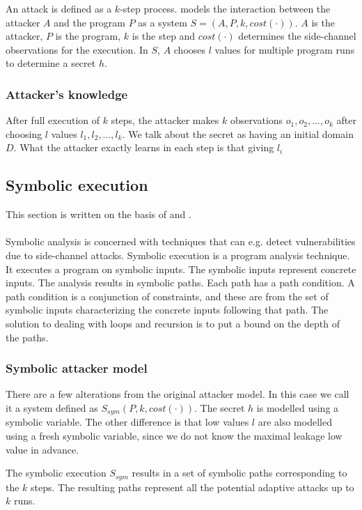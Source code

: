 \documentclass[11pt,a4paper,notitlepage]{article}
\begin{document}
An attack is defined as a $k$-step process. \cite{phan2017synthesis} models the interaction between the attacker $A$ and the program $P$ as a system $S = (A,P,k,cost(\cdot))$. $A$ is the attacker, $P$ is the program, $k$ is the step and $cost(\cdot)$ determines the side-channel observations for the execution. In $S$, $A$ chooses $l$ values for multiple program runs to determine a secret $h$. 

\subsubsection{Attacker's knowledge}

After full execution of $k$ steps, the attacker makes $k$ observations $o_1,o_2,...,o_k$ after choosing $l$ values $l_1,l_2,...,l_k$. We talk about the secret as having an initial domain $D$. What the attacker exactly learns in each step is that giving $l_i$ 

\subsection{Symbolic execution}
\label{sec:symbolicexecution}
This section is written on the basis of \cite{phan2017synthesis} and \cite{malacaria2018symbolic}.
\\\\
Symbolic analysis is concerned with techniques that can e.g. detect vulnerabilities due to side-channel attacks. Symbolic execution is a program analysis technique. It executes a program on symbolic inputs. The symbolic inputs represent concrete inputs. The analysis results in symbolic paths. Each path has a path condition. A path condition is a conjunction of constraints, and these are from the set of symbolic inputs characterizing the concrete inputs following that path. The solution to dealing with loops and recursion is to put a bound on the depth of the paths.  

\subsubsection{Symbolic attacker model}
There are a few alterations from the original attacker model. In this case we call it a system defined as $S_{sym}(P,k,cost(\cdot))$. The secret $h$ is modelled using a symbolic variable. The other difference is that low values $l$ are also modelled using a fresh symbolic variable, since we do not know the maximal leakage low value in advance.

The symbolic execution $S_{sym}$ results in a set of symbolic paths corresponding to the $k$ steps. The resulting paths represent all the potential adaptive attacks up to $k$ runs. 
\end{document}
